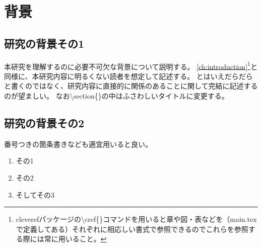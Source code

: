 \chapter{背景}\label{ch:background}

\section{研究の背景その1}\label{sec:background1}

本研究を理解するのに必要不可欠な背景について説明する。
\cref{ch:introduction}\footnote{cleverefパッケージの{\textbackslash}cref\{\}コマンドを用いると章や図・表などを（main.texで定義してある）それぞれに相応しい書式で参照できるのでこれらを参照する際には常に用いること。}と同様に、本研究内容に明るくない読者を想定して記述する。
とはいえだらだらと書くのではなく、研究内容に直接的に関係のあることに関して完結に記述するのが望ましい。
なお{\textbackslash}section\{\}の中はふさわしいタイトルに変更する。

\section{研究の背景その2}\label{sec:background2}

番号つきの箇条書きなども適宜用いると良い。
\begin{enumerate}
  \item その1
  \item その2
  \item そしてその3
\end{enumerate}